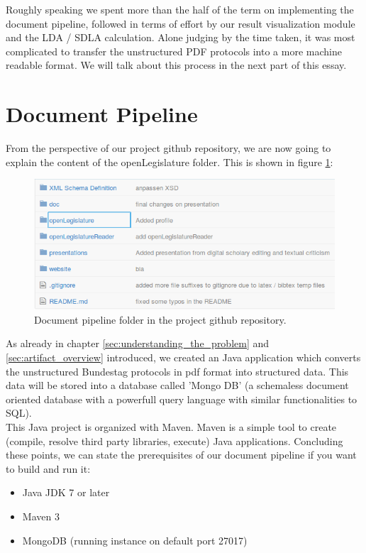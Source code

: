 \documentclass[12pt,paper=a4,nenglish]{scrreprt}
\begin{document}
Roughly speaking we spent more than the half of the term on implementing
the document pipeline, followed in terms of effort by our result visualization
module and the LDA / SDLA calculation. Alone judging by the time taken, it was
most complicated to transfer the unstructured PDF protocols into a more machine
readable format. We will talk about this process in the next part of this essay.

\section{Document Pipeline} 
From the perspective of our project github repository, we are now going to
explain the content of the openLegislature folder. This is shown in figure
\ref{pic:doc_pipeline_github}: 
\begin{figure}[H] 
	\centering
	\includegraphics[scale=0.7]{res/document_pipeline.png}
	\caption{Document pipeline folder in the project github repository.}%
	\label{pic:doc_pipeline_github}%
\end{figure}%
As already in chapter \ref{sec:understanding_the_problem} and
\ref{sec:artifact_overview} introduced, we created an Java application which
converts the unstructured Bundestag protocols in pdf format into structured
data. This data will be stored into a database called 'Mongo DB' (a
schemaless document oriented database with a powerfull query language with
similar functionalities to SQL). \\
This Java project is organized with Maven. 
Maven is a simple tool to create (compile, resolve third party libraries,
execute) Java applications. Concluding these points, we can state the
prerequisites of our document pipeline if you want to build and run it:
\begin{itemize}
  \item Java JDK 7 or later
  \item Maven 3
  \item MongoDB (running instance on default port 27017) 
\end{itemize}
\end{document}
